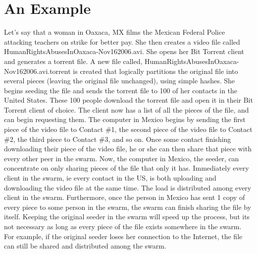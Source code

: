 \documentclass[a4paper,12pt]{report}
\begin{document}
\section{An Example}
Let's say that a woman in Oaxaca, MX films the Mexican Federal Police attacking teachers on strike for better pay.
She then creates a video file called HumanRightsAbusesInOaxaca-Nov162006.avi. She opens her Bit Torrent client and generates a torrent file.
A new file called, HumanRightsAbusesInOaxaca-Nov162006.avi.torrent is created that logically partitions the original file into several pieces (leaving the original file unchanged), using simple hashes.
She begins seeding the file and sends the torrent file to 100 of her contacts in the United States.
These 100 people download the torrent file and open it in their Bit Torrent client of choice.
The client now has a list of all the pieces of the file, and can begin requesting them.
The computer in Mexico begins by sending the first piece of the video file to Contact \#1, the second piece of the video file to Contact \#2, the third piece to Contact \#3, and so on.
Once some contact finishing downloading their piece of the video file, he or she can then share that piece with every other peer in the swarm.
Now, the computer in Mexico, the seeder, can concentrate on only sharing pieces of the file that only it has.
Immediately every client in the swarm, ie every contact in the US, is both uploading and downloading the video file at the same time.
The load is distributed among every client in the swarm.
Furthermore, once the person in Mexico has sent 1 copy of every piece to some person in the swarm, the swarm can finish sharing the file by itself.
Keeping the original seeder in the swarm will speed up the process, but its not necessary as long as every piece of the file exists somewhere in the swarm.
For example, if the original seeder loses her connection to the Internet, the file can still be shared and distributed among the swarm.
\end{document}
